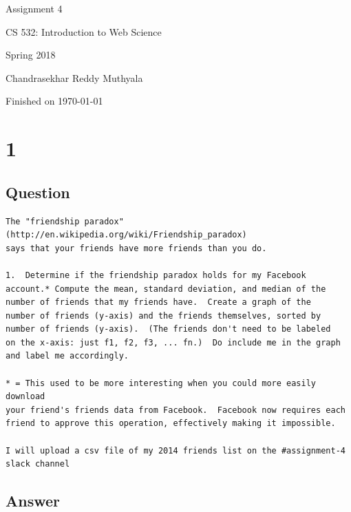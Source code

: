 \documentclass[letterpaper,11pt]{article}
\begin{document}
\begin{titlepage}

\begin{center}

\Huge{Assignment 4}

\Large{CS 532:  Introduction to Web Science}

\Large{Spring 2018}

\Large{Chandrasekhar Reddy Muthyala}

\Large Finished on \today

\end{center}

\end{titlepage}

\newpage


\section*{1}


\subsection*{Question}



\begin{verbatim}
The "friendship paradox" (http://en.wikipedia.org/wiki/Friendship_paradox)
says that your friends have more friends than you do.  

1.  Determine if the friendship paradox holds for my Facebook
account.* Compute the mean, standard deviation, and median of the
number of friends that my friends have.  Create a graph of the
number of friends (y-axis) and the friends themselves, sorted by
number of friends (y-axis).  (The friends don't need to be labeled
on the x-axis: just f1, f2, f3, ... fn.)  Do include me in the graph
and label me accordingly.

* = This used to be more interesting when you could more easily download
your friend's friends data from Facebook.  Facebook now requires each
friend to approve this operation, effectively making it impossible.

I will upload a csv file of my 2014 friends list on the #assignment-4 slack channel
\end{verbatim}


\clearpage
\subsection*{Answer}
\end{document}

